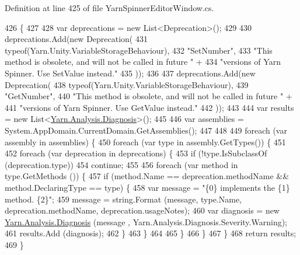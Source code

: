 Definition at line 425 of file Yarn\-Spinner\-Editor\-Window.\-cs.


\begin{DoxyCode}
426         \{
427 
428             var deprecations = \textcolor{keyword}{new} List<Deprecation>();
429 
430             deprecations.Add(\textcolor{keyword}{new} Deprecation(
431                 typeof(Yarn.Unity.VariableStorageBehaviour),
432                 \textcolor{stringliteral}{"SetNumber"},
433                 \textcolor{stringliteral}{"This method is obsolete, and will not be called in future "} +
434                 \textcolor{stringliteral}{"versions of Yarn Spinner. Use SetValue instead."}
435             ));
436 
437             deprecations.Add(\textcolor{keyword}{new} Deprecation(
438                 typeof(Yarn.Unity.VariableStorageBehaviour),
439                 \textcolor{stringliteral}{"GetNumber"},
440                 \textcolor{stringliteral}{"This method is obsolete, and will not be called in future "} +
441                 \textcolor{stringliteral}{"versions of Yarn Spinner. Use GetValue instead."}
442             ));
443 
444             var results = \textcolor{keyword}{new} List<\hyperlink{a00089}{Yarn.Analysis.Diagnosis}>();
445 
446             var assemblies = System.AppDomain.CurrentDomain.GetAssemblies();
447 
448 
449             \textcolor{keywordflow}{foreach} (var assembly \textcolor{keywordflow}{in} assemblies) \{
450                 \textcolor{keywordflow}{foreach} (var type \textcolor{keywordflow}{in} assembly.GetTypes()) \{
451 
452                     \textcolor{keywordflow}{foreach} (var deprecation \textcolor{keywordflow}{in} deprecations) \{
453                         \textcolor{keywordflow}{if} (!type.IsSubclassOf (deprecation.type))
454                             \textcolor{keywordflow}{continue};
455 
456                         \textcolor{keywordflow}{foreach} (var method \textcolor{keywordflow}{in} type.GetMethods ()) \{
457                             \textcolor{keywordflow}{if} (method.Name == deprecation.methodName && method.DeclaringType == type) \{
458                                 var message = \textcolor{stringliteral}{"\{0\} implements the \{1\} method. \{2\}"};
459                                 message = string.Format (message, type.Name, deprecation.methodName, 
      deprecation.usageNotes);
460                                 var diagnosis = \textcolor{keyword}{new} \hyperlink{a00089}{Yarn.Analysis.Diagnosis} (message
      , Yarn.Analysis.Diagnosis.Severity.Warning);
461                                 results.Add (diagnosis);
462                             \}
463                         \}
464 
465                     \}
466                 \}
467             \}
468             \textcolor{keywordflow}{return} results;
469         \}
\end{DoxyCode}
